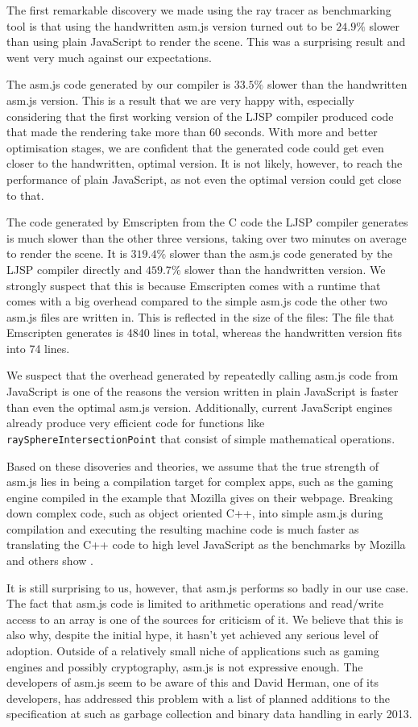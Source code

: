 \documentclass[11pt]{report}
\begin{document}
The first remarkable discovery we made using the ray tracer as benchmarking tool is that using the handwritten asm.js version turned out to be $24.9\%$ slower than using plain JavaScript to render the scene. This was a surprising result and went very much against our expectations.

The asm.js code generated by our compiler is $33.5\%$ slower than the handwritten asm.js version. This is a result that we are very happy with, especially considering that the first working version of the LJSP compiler produced code that made the rendering take more than 60 seconds. With more and better optimisation stages, we are confident that the generated code could get even closer to the handwritten, optimal version. It is not likely, however, to reach the performance of plain JavaScript, as not even the optimal version could get close to that.

The code generated by Emscripten from the C code the LJSP compiler generates is much slower than the other three versions, taking over two minutes on average to render the scene. It is $319.4\%$ slower than the asm.js code generated by the LJSP compiler directly and $459.7\%$ slower than the handwritten version. We strongly suspect that this is because Emscripten comes with a runtime that comes with a big overhead compared to the simple asm.js code the other two asm.js files are written in. This is reflected in the size of the files: The file that Emscripten generates is 4840 lines in total, whereas the handwritten version fits into 74 lines.

We suspect that the overhead generated by repeatedly calling asm.js code from JavaScript is one of the reasons the version written in plain JavaScript is faster than even the optimal asm.js version. Additionally, current JavaScript engines already produce very efficient code for functions like \texttt{raySphereIntersectionPoint} that consist of simple mathematical operations.

Based on these disoveries and theories, we assume that the true strength of asm.js lies in being a compilation target for complex apps, such as the gaming engine compiled in the example that Mozilla gives on their webpage. Breaking down complex code, such as object oriented C++, into simple asm.js during compilation and executing the resulting machine code is much faster as translating the C++ code to high level JavaScript as the benchmarks by Mozilla and others show \cite{asmjsbenchmarks}.

It is still surprising to us, however, that asm.js performs so badly in our use case. The fact that asm.js code is limited to arithmetic operations and read/write access to an array is one of the sources for criticism \cite{adblock, whybothers} of it. We believe that this is also why, despite the initial hype, it hasn't yet achieved any serious level of adoption. Outside of a relatively small niche of applications such as gaming engines and possibly cryptography, asm.js is not expressive enough. The developers of asm.js seem to be aware of this and David Herman, one of its developers, has addressed this problem with a list of planned additions to the specification at \cite{asmjsadditions} such as garbage collection and binary data handling in early 2013.
\end{document}
